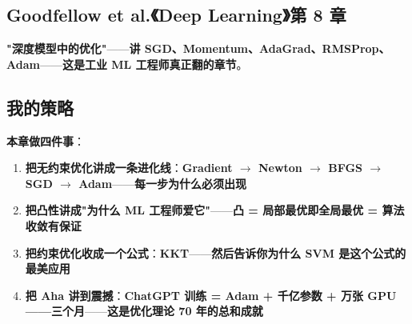 \subsection{Goodfellow et al.《Deep Learning》第 8 章}

\textbf{"深度模型中的优化"}——\textbf{讲 SGD、Momentum、AdaGrad、RMSProp、Adam}——\textbf{这是工业 ML 工程师真正翻的章节}。

\subsection{我的策略}

\textbf{本章做四件事}：

\begin{enumerate}
\item \textbf{把无约束优化讲成一条进化线}：\textbf{Gradient $\to$ Newton $\to$ BFGS $\to$ SGD $\to$ Adam}——\textbf{每一步为什么必须出现}
\item \textbf{把凸性讲成"为什么 ML 工程师爱它"}——\textbf{凸 = 局部最优即全局最优 = 算法收敛有保证}
\item \textbf{把约束优化收成一个公式}：\textbf{KKT}——\textbf{然后告诉你为什么 SVM 是这个公式的最美应用}
\item \textbf{把 Aha 讲到震撼}：\textbf{ChatGPT 训练 = Adam + 千亿参数 + 万张 GPU——三个月}——\textbf{这是优化理论 70 年的总和成就}
\end{enumerate}

